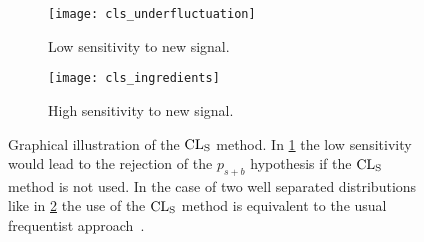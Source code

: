 \begin{figure}[!h]
  \centering
  \begin{subfigure}{.48\linewidth}
    \texttt{[image: cls\_underfluctuation]}
    \caption{Low sensitivity to new signal.}
    \label{fig:cls_underfluctuation}
  \end{subfigure}
  \begin{subfigure}{.48\linewidth}
    \texttt{[image: cls\_ingredients]}
    \caption{High sensitivity to new signal.}
    \label{fig:cls_ingredients}
  \end{subfigure}
  \caption{Graphical illustration of the $\mathrm{CL}_\mathrm{S}$ method. In
    \cref{fig:cls_underfluctuation} the low sensitivity would lead to the
    rejection of the $p_{s + b}$ hypothesis if the $\mathrm{CL}_\mathrm{S}$ method is not
    used. In the case of two well separated distributions like in
    \cref{fig:cls_ingredients} the use of the $\mathrm{CL}_\mathrm{S}$ method is equivalent to the
    usual frequentist approach~\cite{CowanCLsPlots}.}
  \label{fig:cls_method}
\end{figure}
